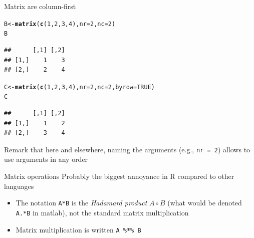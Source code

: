\documentclass[aspectratio=169]{beamer}\usepackage[]{graphicx}\usepackage[]{xcolor}
\makeatletter
\newcommand{\hlnum}[1]{\textcolor[rgb]{0.686,0.059,0.569}{#1}}%
\newcommand{\hldef}[1]{\textcolor[rgb]{0.345,0.345,0.345}{#1}}%
\newcommand{\hlkwb}[1]{\textcolor[rgb]{0.69,0.353,0.396}{#1}}%
\newcommand{\hlkwc}[1]{\textcolor[rgb]{0.333,0.667,0.333}{#1}}%
\newcommand{\hlkwd}[1]{\textcolor[rgb]{0.737,0.353,0.396}{\textbf{#1}}}%
\newenvironment{kframe}{%
 \def\at@end@of@kframe{}%
 \ifinner\ifhmode%
  \def\at@end@of@kframe{\end{minipage}}%
  \begin{minipage}{\columnwidth}%
 \fi\fi%
 \def\FrameCommand##1{\hskip\@totalleftmargin \hskip-\fboxsep
 \colorbox{shadecolor}{##1}\hskip-\fboxsep
     \hskip-\linewidth \hskip-\@totalleftmargin \hskip\columnwidth}%
 \MakeFramed {\advance\hsize-\width
   \@totalleftmargin\z@ \linewidth\hsize
   \@setminipage}}%
 {\par\unskip\endMakeFramed%
 \at@end@of@kframe}
\newenvironment{knitrout}{}{} %
\makeatother
\begin{document}
\begin{frame}[fragile]{Matrix are column-first}
\begin{knitrout}
\color{fgcolor}\begin{kframe}
\begin{alltt}
\hldef{B} \hlkwb{<-} \hlkwd{matrix}\hldef{(}\hlkwd{c}\hldef{(}\hlnum{1}\hldef{,}\hlnum{2}\hldef{,}\hlnum{3}\hldef{,}\hlnum{4}\hldef{),} \hlkwc{nr} \hldef{=} \hlnum{2}\hldef{,} \hlkwc{nc} \hldef{=} \hlnum{2}\hldef{)}
\hldef{B}
\end{alltt}
\begin{verbatim}
##      [,1] [,2]
## [1,]    1    3
## [2,]    2    4
\end{verbatim}
\begin{alltt}
\hldef{C} \hlkwb{<-} \hlkwd{matrix}\hldef{(}\hlkwd{c}\hldef{(}\hlnum{1}\hldef{,}\hlnum{2}\hldef{,}\hlnum{3}\hldef{,}\hlnum{4}\hldef{),} \hlkwc{nr} \hldef{=} \hlnum{2}\hldef{,} \hlkwc{nc} \hldef{=} \hlnum{2}\hldef{,} \hlkwc{byrow} \hldef{=} \hlnum{TRUE}\hldef{)}
\hldef{C}
\end{alltt}
\begin{verbatim}
##      [,1] [,2]
## [1,]    1    2
## [2,]    3    4
\end{verbatim}
\end{kframe}
\end{knitrout}

Remark that here and elsewhere, naming the arguments (e.g., \texttt{nr = 2}) allows to use arguments in any order
\end{frame}

\begin{frame}{Matrix operations}
Probably the biggest annoyance in R compared to other languages
\vfill
\begin{itemize}
\item The notation \texttt{A*B} is the \textit{Hadamard product} $A\circ B$ (what would be denoted \texttt{A.*B} in matlab), not the standard matrix multiplication
\vfill
\item Matrix multiplication is written \texttt{A \%*\% B}
\end{itemize}
\end{frame}
\end{document}
